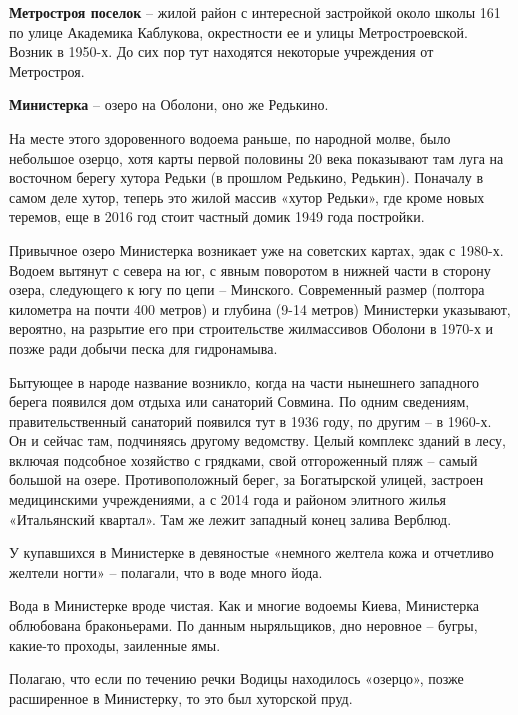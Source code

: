 \textbf{Метростроя поселок} – жилой район с интересной застройкой около школы 161 по улице Академика Каблукова, окрестности ее и улицы Метростроевской. Возник в 1950-х. До сих пор тут находятся некоторые учреждения от Метростроя.\\

\medskip


\textbf{Министерка} – озеро на Оболони, оно же Редькино.

На месте этого здоровенного водоема раньше, по народной молве, было небольшое озерцо, хотя карты первой половины 20 века показывают там луга на восточном берегу хутора Редьки (в прошлом Редькино, Редькин). Поначалу в самом деле хутор, теперь это жилой массив «хутор Редьки», где кроме новых теремов, еще в 2016 год стоит частный домик 1949 года постройки. 


Привычное озеро Министерка возникает уже на советских картах, эдак с 1980-х. Водоем вытянут с севера на юг, с явным поворотом в нижней части в сторону озера, следующего к югу по цепи – Минского. Современный размер (полтора километра на почти 400 метров) и глубина (9-14 метров) Министерки указывают, вероятно, на разрытие его при строительстве жилмассивов Оболони в 1970-х и позже ради добычи песка для гидронамыва.

Бытующее в народе название возникло, когда на части нынешнего западного берега появился дом отдыха или санаторий Совмина. По одним сведениям, правительственный санаторий появился тут в 1936 году, по другим – в 1960-х. Он и сейчас там, подчиняясь другому ведомству. Целый комплекс зданий в лесу, включая подсобное хозяйство с грядками, свой отгороженный пляж – самый большой на озере. Противоположный берег, за Богатырской улицей, застроен медицинскими учреждениями, а с 2014 года и районом элитного жилья «Итальянский квартал». Там же лежит западный конец залива Верблюд.

У купавшихся в Министерке в девяностые «немного желтела кожа и отчетливо желтели ногти» – полагали, что в воде много йода.

Вода в Министерке вроде чистая. Как и многие водоемы Киева, Министерка облюбована браконьерами. По данным ныряльщиков, дно неровное – бугры, какие-то проходы, заиленные ямы.

Полагаю, что если по течению речки Водицы находилось «озерцо», позже расширенное в Министерку, то это был хуторской пруд.



